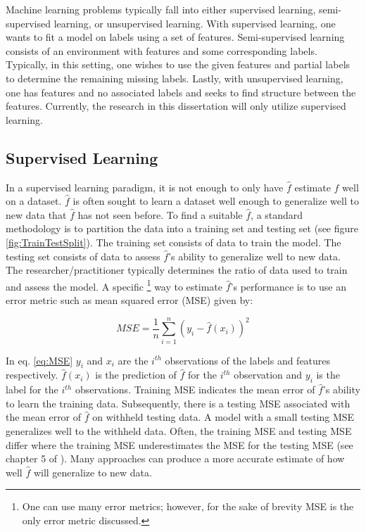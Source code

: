 Machine learning problems typically fall into either supervised learning, semi-supervised learning, or unsupervised learning. With supervised learning, one wants to fit a model on labels using a set of features. Semi-supervised learning consists of an environment with features and some corresponding labels. Typically, in this setting, one wishes to use the given features and partial labels to determine the remaining missing labels. Lastly, with unsupervised learning, one has features and no associated labels and seeks to find structure between the features.  Currently, the research in this dissertation will only utilize supervised learning. 

\subsection{Supervised Learning} \label{sec:SupervisedLearning}
In a supervised learning paradigm, it is not enough to only have \(\hat{f}\) estimate \(f\) well on a dataset. \(\hat{f}\) is often sought to learn a dataset well enough to generalize well to new data that  \(\hat{f}\) has not seen before. To find a suitable \(\hat{f}\), a standard methodology is to partition the data into a training set and testing set (see figure \ref{fig:TrainTestSplit}). The training set consists of data to train the model. The testing set consists of data to assess \(\hat{f}\)'s ability to generalize well to new data. The researcher/practitioner typically determines the ratio of data used to train and assess the model.  A specific  \footnote{One can use many error metrics; however, for the sake of brevity MSE is the only error metric discussed.}  way to estimate \(\hat{f}\)'s performance is to use an error metric such as mean squared error (MSE) given by:  

\begin{equation}
\label{eq:MSE}
MSE = \frac{1}{n} \sum_{i=1}^n (y_i -\hat{f}(x_i))^2
\end{equation}

\noindent In eq. \ref{eq:MSE} \(y_i\) and \(x_i\) are the \(i^{th}\) observations of the labels and features respectively. \(\hat{f}(x_i)\) is the prediction of \(\hat{f}\) for the \(i^{th}\) observation and \(y_i\) is the label for the \(i^{th}\) observations. Training MSE indicates the mean error of \(\hat{f}\)'s ability to learn the training data.  Subsequently, there is a testing MSE associated with the mean error of \(\hat{f}\) on withheld testing data. A model with a small testing MSE generalizes well to the withheld data. Often, the training MSE and testing MSE differ where the training MSE underestimates the MSE for the testing MSE (see chapter 5 of \cite{ISL}). Many approaches can produce a more accurate estimate of how well \(\hat{f}\) will generalize to new data.

